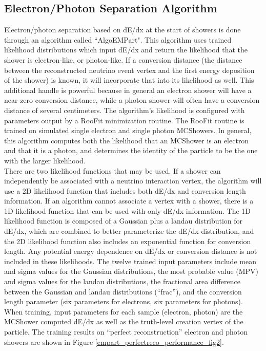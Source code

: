\subsection{Electron/Photon Separation Algorithm}\label{algoempart_section}
Electron/photon separation based on dE/dx at the start of showers is done through an algorithm called ``AlgoEMPart". This algorithm uses trained likelihood distributions which input dE/dx and return the likelihood that the shower is electron-like, or photon-like. If a conversion distance (the distance between the reconstructed neutrino event vertex and the first energy deposition of the shower) is known, it will incorporate that into its likelihood as well. This additional handle is powerful because in general an electron shower will have a near-zero conversion distance, while a photon shower will often have a conversion distance of several centimeters. The algorithm's likelihood is configured with parameters output by a RooFit \cite{ROOFITsource} minimization routine. The RooFit routine is trained on simulated single electron and single photon {\sc MCShowers}. In general, this algorithm computes both the likelihood that an {\sc MCShower} is an electron and that it is a photon, and determines the identity of the particle to be the one with the larger likelihood.\\

There are two likelihood functions that may be used. If a shower can independently be associated with a neutrino interaction vertex, the algorithm will use a 2D likelihood function that includes both dE/dx and conversion length information. If an algorithm cannot associate a vertex with a shower, there is a 1D likelihood function that can be used with only dE/dx information. The 1D likelihood function is composed of a Gaussian plus a landau distribution for dE/dx, which are combined to better parameterize the dE/dx distribution, and the 2D likelihood function also includes an exponential function for conversion length. Any potential energy dependence on dE/dx or conversion distance is not included in these likelihoods. The twelve trained input parameters include mean and sigma values for the Gaussian distributions, the most probable value (MPV) and sigma values for the landau distributions, the fractional area difference between the Gaussian and landau distributions (``frac''), and the conversion length parameter (six parameters for electrons, six parameters for photons). When training, input parameters for each sample (electron, photon) are the {\sc MCShower} computed dE/dx as well as the truth-level creation vertex of the particle. The training results on ``perfect reconstruction'' electron and photon showers are shown in Figure \ref{empart_perfectreco_performance_fig2}.%

